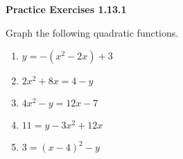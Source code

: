 \noindent\textbf{Practice Exercises 1.13.1}


Graph the following quadratic functions. 
\begin{multicols}{2}
\begin{enumerate}[label = \color{blue}\arabic*. ]
\item $ y = -(x^{2} - 2x ) + 3 $
\item $ 2x^{2} + 8x = 4 - y $
\item $ 4x^{2} - y = 12x - 7 $
\item $ 11 = y - 3x^{2} + 12x $
\item $ 3 = (x - 4)^{2} - y $
\end{enumerate}
\end{multicols} 
